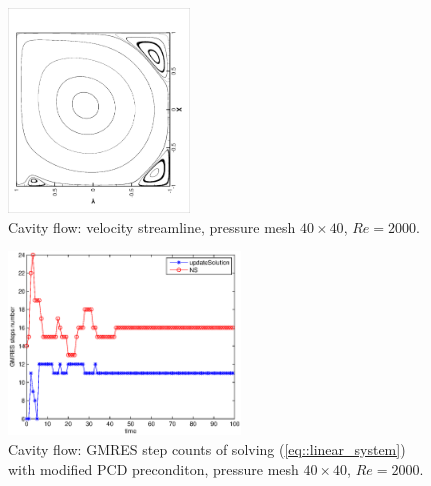 \documentclass{eajam}
\begin{document}
       \begin{figure}[!htbp]
         \begin{center}
             \includegraphics[width = 0.43\textwidth, angle = -90]{picture/cavity_flow_data/streamline.eps}
        \end{center}
        \caption{\small Cavity flow: velocity streamline, pressure
          mesh $40 \times 40$, $Re = 2000$.}
        \label{fig::cavity_flow_streamline}
       \end{figure}

       \begin{figure}[!htbp]
         \begin{center}
             \includegraphics[width = 0.55\textwidth, angle = 0]{picture/cavity_flow_data/NS_iterate_steps.eps}
        \end{center}
        \caption{\small Cavity flow: GMRES step counts of solving
          (\ref{eq::linear_system}) with modified PCD preconditon,
          pressure mesh $40 \times 40$, $Re = 2000$.}
        \label{fig::cavity_GMRES_steps}
       \end{figure}
       
\end{document}
